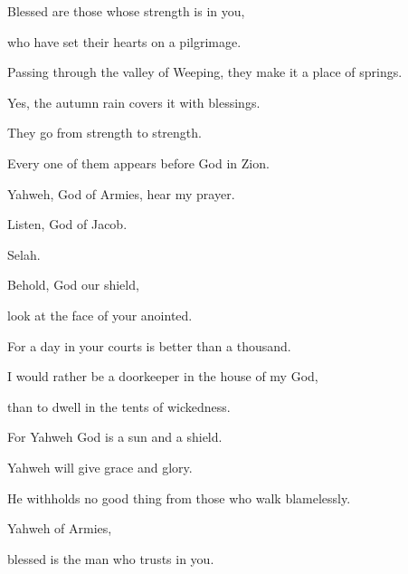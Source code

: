 {\Q {}Blessed are those whose strength is in you,
\par }{\QB who have set their hearts on a pilgrimage.
\par }{\Q {}Passing through the valley of Weeping, they make it a place of springs.
\par }{\QB Yes, the autumn rain covers it with blessings.
\par }{\Q {}They go from strength to strength.
\par }{\QB Every one of them appears before God in Zion.
\par }{\Q {}Yahweh, God of Armies, hear my prayer.
\par }{\QB Listen, God of Jacob.
\par }{\QS Selah.\par }
{\Q {}Behold, God our shield,
\par }{\QB look at the face of your anointed.
\par }{\Q {}For a day in your courts is better than a thousand.
\par }{\QB I would rather be a doorkeeper in the house of my God,
\par }{\QB than to dwell in the tents of wickedness.
\par }{\Q {}For Yahweh God is a sun and a shield.
\par }{\QB Yahweh will give grace and glory.
\par }{\QB He withholds no good thing from those who walk blamelessly.
\par }{\Q {}Yahweh of Armies,
\par }{\QB blessed is the man who trusts in you.

\par }
